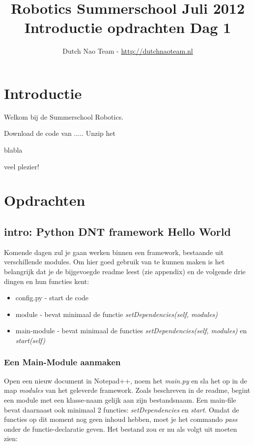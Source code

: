 \documentclass[a4paper]{article}
\title{\textbf{Robotics Summerschool Juli 2012} \\ Introductie opdrachten Dag 1}
\author{Dutch Nao Team - \url{http://dutchnaoteam.nl}}
\date{}
\begin{document}
\maketitle

\section{Introductie}
Welkom bij de Summerschool Robotics.

Download de code van .....
Unzip het 

blabla

veel plezier!


\tableofcontents

\newpage


\section{Opdrachten}

\subsection{intro: Python DNT framework Hello World}
Komende dagen zul je gaan werken binnen een framework, bestaande uit verschillende modules. Om hier goed gebruik van te kunnen maken is het belangrijk dat je de bijgevoegde readme leest (zie appendix) en de volgende drie dingen en hun functies kent:
\begin{itemize}
\item config.py - start de code
\item module - bevat minimaal de functie \textit{setDependencies(self, modules)}
\item main-module - bevat minimaal de functies \textit{setDependencies(self, modules)} en \textit{start(self)}
\end{itemize}

\subsubsection{Een Main-Module aanmaken}
Open een nieuw document in Notepad++, noem het \textit{main.py} en sla het op in de map \textit{modules} van het geleverde framework. 
Zoals beschreven in de readme, begint een module met een klasse-naam gelijk aan zijn bestandsnaam. Een main-file bevat daarnaast ook minimaal 2 functies: \textit{setDependencies} en \textit{start}.
Omdat de functies op dit moment nog geen inhoud hebben, moet je het commando \textit{pass} onder de functie-declaratie geven. Het bestand zou er nu als volgt uit moeten zien:
\end{document}
